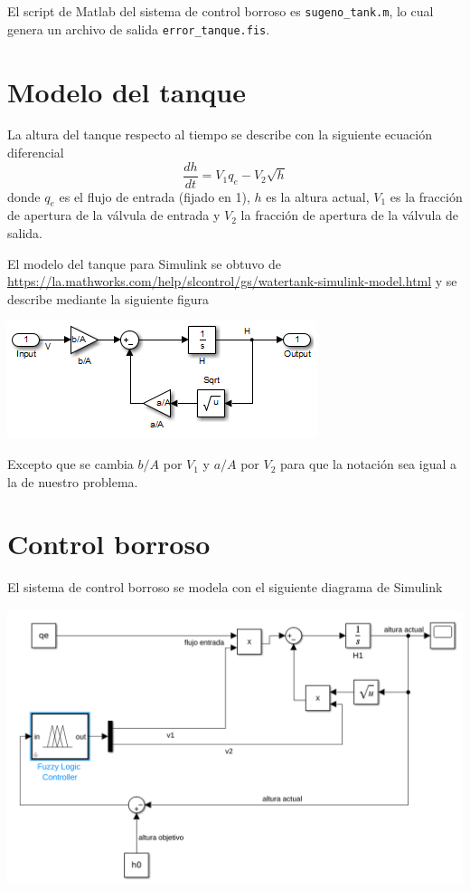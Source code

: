 \documentclass{article}
\begin{document}
El script de Matlab del sistema de control borroso es \texttt{sugeno\_tank.m}, lo cual genera un archivo de salida \texttt{error\_tanque.fis}.

\section{Modelo del tanque}

La altura del tanque respecto al tiempo se describe con la siguiente ecuación diferencial $$ \frac{dh}{dt} = V_1 q_e - V_2 \sqrt{h} $$ donde $q_e$ es el flujo de entrada (fijado en 1), $h$ es la altura actual, $V_1$ es la fracción de apertura de la válvula de entrada y $V_2$ la fracción de apertura de la válvula de salida.

El modelo del tanque para Simulink se obtuvo de \url{https://la.mathworks.com/help/slcontrol/gs/watertank-simulink-model.html} y se describe mediante la siguiente figura

\begin{center}
\includegraphics[scale=1]{op_watertank_subsystem}
\end{center}

Excepto que se cambia $b/A$ por $V_1$ y $a/A$ por $V_2$ para que la notación sea igual a la de nuestro problema.

\section{Control borroso}

El sistema de control borroso se modela con el siguiente diagrama de Simulink

\begin{center}
\includegraphics[width=\linewidth]{diagrama_fuzzy_control}
\end{center}
\end{document}

